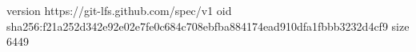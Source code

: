 version https://git-lfs.github.com/spec/v1
oid sha256:f21a252d342e92e02e7fe0c684c708ebfba884174ead910dfa1fbbb3232d4cf9
size 6449
